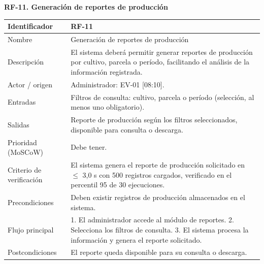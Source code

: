 \documentclass[12pt,a4paper]{article}
\begin{document}
\begin{minipage}{\linewidth}
\bigskip
\noindent\textbf{RF-11. Generación de reportes de producción}
\label{tab:RF-11}

\begin{center}
\begin{tabular}{|p{3.5cm}|p{10.7cm}|}
\hline
Identificador & RF-11 \\
\hline
Nombre & Generación de reportes de producción \\
\hline
Descripción & El sistema deberá permitir generar reportes de producción por cultivo, parcela o período, facilitando el análisis de la información registrada. \\
\hline
Actor / origen & Administrador: EV-01 [08:10]. \\
\hline
Entradas & Filtros de consulta: cultivo, parcela o período (selección, al menos uno obligatorio). \\
\hline
Salidas & Reporte de producción según los filtros seleccionados, disponible para consulta o descarga. \\
\hline
Prioridad (MoSCoW) & Debe tener. \\
\hline
Criterio de verificación & El sistema genera el reporte de producción solicitado en $\leq$ 3,0 s con 500 registros cargados, verificado en el percentil 95 de 30 ejecuciones. \\
\hline
Precondiciones & Deben existir registros de producción almacenados en el sistema. \\
\hline
Flujo principal & 1. El administrador accede al módulo de reportes. 2. Selecciona los filtros de consulta. 3. El sistema procesa la información y genera el reporte solicitado. \\
\hline
Postcondiciones & El reporte queda disponible para su consulta o descarga. \\
\hline
\end{tabular}
\end{center}
\end{minipage}
\end{document}
